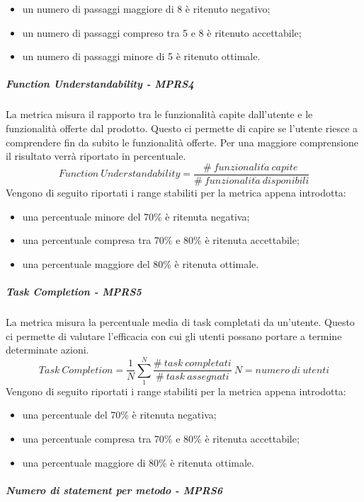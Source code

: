 \documentclass[../PianoDiQualifica.tex]{subfiles}
\begin{document}
			\begin{itemize}
				\item un numero di passaggi maggiore di 8 è ritenuto negativo;
				\item un numero di passaggi compreso tra 5 e 8 è ritenuto accettabile;
				\item un numero di passaggi minore di 5 è ritenuto ottimale.
			\end{itemize}
			\subparagraph{Function Understandability - MPRS4}\label{MPRS4}
			La metrica misura il rapporto tra le funzionalità capite dall'utente e le funzionalità offerte dal prodotto\g. Questo ci permette di capire se l'utente riesce a comprendere fin da subito 
			le funzionalità offerte. Per una maggiore comprensione il risultato verrà riportato in percentuale.
			\begin{equation}
			Function \ Understandability = \frac{\#\ funzionalit\grave{a} \ capite\ }{\#\ funzionalit\grave{a} \ disponibili}
			\end{equation}
			Vengono di seguito riportati i range stabiliti per la metrica appena introdotta:
			\begin{itemize}
				\item una percentuale minore del 70\% è ritenuta negativa;
				\item una percentuale compresa tra 70\% e 80\% è ritenuta accettabile;
				\item una percentuale maggiore del 80\% è ritenuta ottimale.
			\end{itemize}
			\subparagraph{Task Completion - MPRS5}\label{MPRS5}
			La metrica misura la percentuale media di task completati da un'utente. Questo ci permette di valutare l'efficacia con cui gli utenti possano portare a termine determinate azioni.
			\begin{equation}
			Task \ Completion = \frac{1}{N} \sum_{1}^{N} \frac{\#\ task \ completati }{\#\ task \ assegnati}
			\ N = numero \ di \ utenti
			\end{equation}
			Vengono di seguito riportati i range stabiliti per la metrica appena introdotta:
			\begin{itemize}
				\item una percentuale del 70\% è ritenuta negativa;
				\item una percentuale compresa tra 70\% e 80\% è ritenuta accettabile;
				\item una percentuale maggiore di 80\% è ritenuta ottimale.
			\end{itemize}
			\subparagraph{Numero di statement per metodo - MPRS6}\label{MPRS6}
\end{document}
